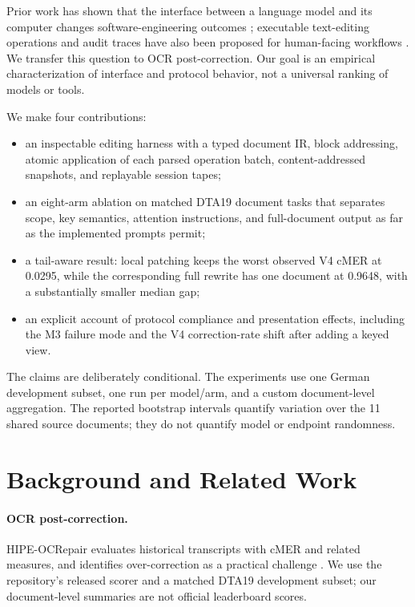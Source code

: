 \documentclass{article}
\begin{document}
Prior work has shown that the interface between a language model and its computer changes software-engineering outcomes \citep{yang2024sweagent}; executable text-editing operations and audit traces have also been proposed for human-facing workflows \citep{laban2023inksync}. We transfer this question to OCR post-correction. Our goal is an empirical characterization of interface and protocol behavior, not a universal ranking of models or tools.

We make four contributions:
\begin{itemize}
  \item an inspectable editing harness with a typed document IR, block addressing, atomic application of each parsed operation batch, content-addressed snapshots, and replayable session tapes;
  \item an eight-arm ablation on matched DTA19 document tasks that separates scope, key semantics, attention instructions, and full-document output as far as the implemented prompts permit;
  \item a tail-aware result: local patching keeps the worst observed V4 cMER at 0.0295, while the corresponding full rewrite has one document at 0.9648, with a substantially smaller median gap;
  \item an explicit account of protocol compliance and presentation effects, including the M3 failure mode and the V4 correction-rate shift after adding a keyed view.
\end{itemize}

The claims are deliberately conditional. The experiments use one German development subset, one run per model/arm, and a custom document-level aggregation. The reported bootstrap intervals quantify variation over the 11 shared source documents; they do not quantify model or endpoint randomness.

\section{Background and Related Work}
\paragraph{OCR post-correction.} HIPE-OCRepair evaluates historical transcripts with cMER and related measures, and identifies over-correction as a practical challenge \citep{ehrmann2026hipe}. We use the repository's released scorer \citep{hipe_scorer} and a matched DTA19 development subset; our document-level summaries are not official leaderboard scores.
\end{document}
